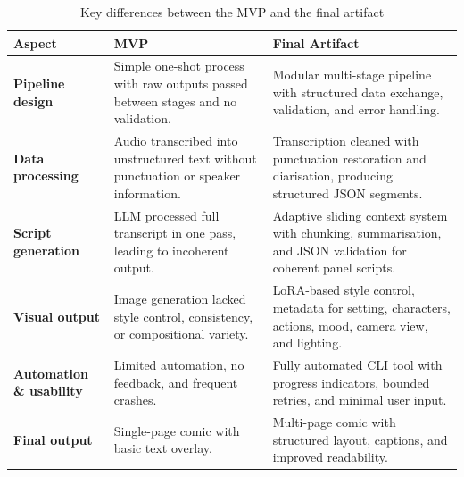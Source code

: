 \begin{table}[H]
\centering
\small
\caption{Key differences between the MVP and the final artifact}
\label{tab:mvp-vs-final}
\begin{tabular}{|p{3.2cm}|p{5.2cm}|p{5.2cm}|}
\hline
\textbf{Aspect} & \textbf{MVP} & \textbf{Final Artifact} \\
\hline
\textbf{Pipeline design} & Simple one-shot process with raw outputs passed between stages and no validation. & Modular multi-stage pipeline with structured data exchange, validation, and error handling. \\
\hline
\textbf{Data processing} & Audio transcribed into unstructured text without punctuation or speaker information. & Transcription cleaned with punctuation restoration and diarisation, producing structured JSON segments. \\
\hline
\textbf{Script generation} & LLM processed full transcript in one pass, leading to incoherent output. & Adaptive sliding context system with chunking, summarisation, and JSON validation for coherent panel scripts. \\
\hline
\textbf{Visual output} & Image generation lacked style control, consistency, or compositional variety. & LoRA-based style control, metadata for setting, characters, actions, mood, camera view, and lighting. \\
\hline
\textbf{Automation \& usability} & Limited automation, no feedback, and frequent crashes. & Fully automated CLI tool with progress indicators, bounded retries, and minimal user input. \\
\hline
\textbf{Final output} & Single-page comic with basic text overlay. & Multi-page comic with structured layout, captions, and improved readability. \\
\hline
\end{tabular}
\end{table}

